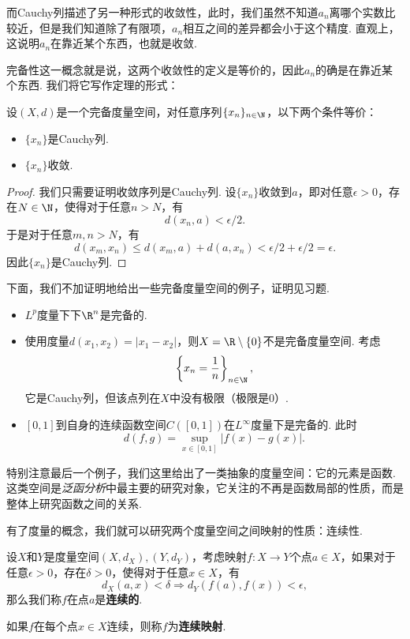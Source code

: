 而Cauchy列描述了另一种形式的收敛性，此时，我们虽然不知道$a_n$离哪个实数比较近，但是我们知道除了有限项，$a_n$相互之间的差异都会小于这个精度. 直观上，这说明$a_n$在靠近某个东西，也就是收敛. 

完备性这一概念就是说，这两个收敛性的定义是等价的，因此$a_n$的确是在靠近某个东西. 我们将它写作定理的形式：

\begin{theorem}\label{thm:complete-metric-space-convergence}
    设$(X,d)$是一个完备度量空间，对任意序列$\{x_n\}_{n\in\N}$，以下两个条件等价：
    \begin{itemize}
        \item $\{x_n\}$是Cauchy列.
        \item $\{x_n\}$收敛.
    \end{itemize}
\end{theorem}
\begin{proof}
    我们只需要证明收敛序列是Cauchy列. 设$\{x_n\}$收敛到$a$，即对任意$\epsilon>0$，存在$N\in\N$，使得对于任意$n>N$，有
    \[d(x_n,a)<\epsilon/2.\]
    于是对于任意$m,n>N$，有
    \[d(x_m,x_n)\leq d(x_m,a)+d(a,x_n)<\epsilon/2+\epsilon/2=\epsilon.\]
    因此$\{x_n\}$是Cauchy列.
\end{proof}

下面，我们不加证明地给出一些完备度量空间的例子，证明见习题.
\begin{example}
\begin{itemize}
\item $L^p$度量下下$\R^n$是完备的.
\item 使用度量$d(x_1,x_2)=|x_1-x_2|$，则$X=\R\setminus\{0\}$不是完备度量空间. 考虑
\[\left\{x_n=\frac1n\right\}_{n\in\N},\]
它是Cauchy列，但该点列在$X$中没有极限（极限是$0$）.

\item $[0,1]$到自身的连续函数空间$C([0,1])$在$L^\infty$度量下是完备的.
此时
\[d(f,g)=\sup_{x\in[0,1]}|f(x)-g(x)|.\]
\end{itemize}
\end{example}

特别注意最后一个例子，我们这里给出了一类抽象的度量空间：它的元素是函数. 这类空间是\emph{泛函分析}中最主要的研究对象，它关注的不再是函数局部的性质，而是整体上研究函数之间的关系.

有了度量的概念，我们就可以研究两个度量空间之间映射的性质：连续性. 

\begin{definition}[连续映射]
设$X$和$Y$是度量空间$(X,d_X),(Y,d_Y)$，考虑映射$f:X\to Y$个点$a\in X$，如果对于任意$\epsilon>0$，存在$\delta>0$，使得对于任意$x\in X$，有
    \[d_X(a,x) < \delta\Rightarrow d_Y(f(a),f(x))<\epsilon,\]
那么我们称$f$在点$a$是\textbf{连续的}.

如果$f$在每个点$x\in X$连续，则称$f$为\textbf{连续映射}.  
\end{definition}

